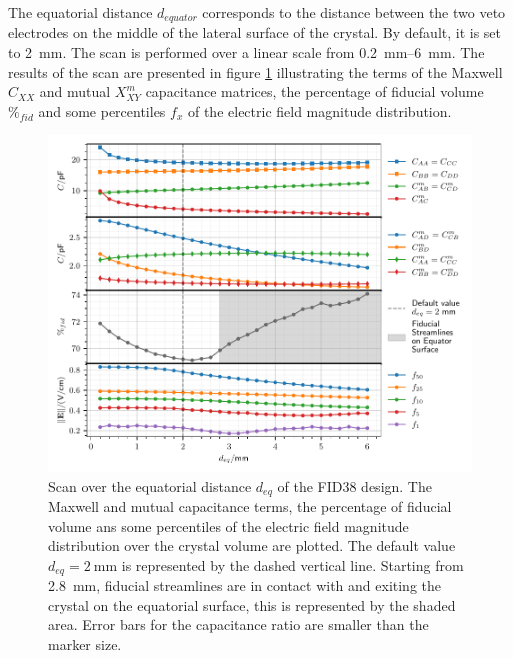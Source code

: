 The equatorial distance $d_{equator}$ corresponds to the distance between the two veto electrodes on the middle of the lateral surface of the crystal. By default, it is set to \SI{2}{\mm}. The scan is performed over a linear scale from \SIrange{0.2}{6}{\mm}. The results of the scan are presented in figure \ref{fig:capacitance-fiducial-equatorial-distance} illustrating the terms of the Maxwell $C_{XX}$ and mutual $X_{XY}^m$ capacitance matrices, the percentage of fiducial volume $\%_{fid}$ and some percentiles $f_x$ of the electric field magnitude distribution. 

\begin{figure}
\centering
\includegraphics[scale=1]{Figures/ElectrodesScan/capacitance_fiducial_equatorial_distance.pdf}
\caption{Scan over the equatorial distance $d_{eq}$ of the FID38 design. The Maxwell and mutual capacitance terms, the percentage of fiducial volume ans some percentiles of the electric field magnitude distribution over the crystal volume are plotted. The default value $d_{eq}=\SI{2}{\mm}$ is represented by the dashed vertical line. Starting from \SI{2.8}{\mm}, fiducial streamlines are in contact with and exiting the crystal on the equatorial surface, this is represented by the shaded area. Error bars for the capacitance ratio are smaller than the marker size.}
\label{fig:capacitance-fiducial-equatorial-distance}
\end{figure}

